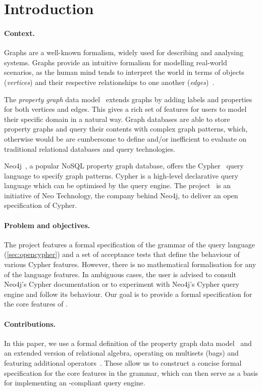 \section{Introduction}
\label{sec:introduction}


\paragraph{Context.} Graphs are a well-known formalism, widely used for describing and analysing systems. Graphs provide an intuitive formalism for modelling real-world scenarios, as the human mind tends to interpret the world in terms of objects (\emph{vertices}) and their respective relationships to one another (\emph{edges})~\cite{CollectivelyGeneratedModel}. 

The \emph{property graph} data model~\cite{DBLP:books/igi/Sakr11/RodriguezN11} extends graphs by adding labels and properties for both vertices and edges. This gives a rich set of features for users to model their specific domain in a natural way. Graph databases are able to store property graphs and query their contents with complex graph patterns, which, otherwise would be are cumbersome to define and/or inefficient to evaluate on traditional relational databases and query technologies.

Neo4j~\cite{Neo4j}, a popular NoSQL property graph database, offers the Cypher~\cite{Cypher} query language to specify graph patterns. Cypher is a high-level declarative query language which can be optimised by the query engine. The \opencypher project~\cite{openCypher} is an initiative of Neo Technology, the company behind Neo4j, to deliver an open specification of Cypher.

\paragraph{Problem and objectives.} The \opencypher project features a formal specification of the grammar of the query language (\cref{sec:opencypher}) and a set of acceptance tests that define the behaviour of various Cypher features. However, there is no mathematical formalisation for any of the language features. In ambiguous cases, the user is advised to consult Neo4j's Cypher documentation or to experiment with Neo4j's Cypher query engine and follow its behaviour. Our goal is to provide a formal specification for the core features of \opencypher.

\paragraph{Contributions.} In this paper, we use a formal definition of the property graph data model~\cite{DBLP:conf/edbt/HolschG16} and an extended version of relational algebra, operating on multisets (bags) and featuring additional operators~\cite{DBLP:books/daglib/0020812}. These allow us to construct a concise formal specification for the core features in the \opencypher grammar, which can then serve as a basis for implementing an \opencypher-compliant query engine.
